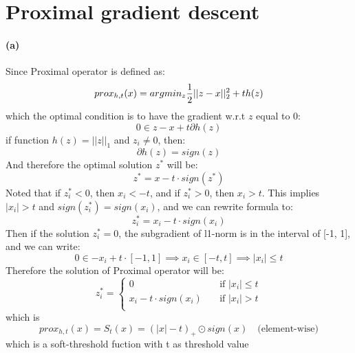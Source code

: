 \documentclass{article}
\begin{document}
\section{Proximal gradient descent}
\paragraph{(a)} Since Proximal operator is defined as:
\begin{equation}
prox_{h,t}(x) = argmin_z{1\over2}||z-x||_2^2 + th(z)
\end{equation}
which the optimal condition is to have the gradient w.r.t $z$ equal to 0:
\begin{equation}
0 \in z-x+t\partial h(z)
\end{equation}
if function $h(z)=||z||_1$ and $z_i \neq 0$, then:
\begin{equation}
\partial h(z) = sign(z)
\end{equation}
And therefore the optimal solution $z^\ast$ will be:
\begin{equation}
z^\ast = x - t\cdot sign(z^\ast)
\end{equation}
Noted that if $z_i^\ast<0$, then $x_i<-t$, and if $z_i^\ast>0$, then $x_i>t$. This implies $|x_i|>t$ and $sign(z_i^\ast) = sign(x_i)$, and we can rewrite formula to:
\begin{equation}
z_i^\ast = x_i - t\cdot sign(x_i)
\end{equation}
Then if the solution $z_i^\ast=0$, the subgradient of l1-norm is in the interval of [-1, 1], and we can write:
\begin{equation}
0 \in -x_i + t \cdot [-1,1] \implies x_i \in [-t, t] \implies |x_i| \leq t
\end{equation}
Therefore the solution of Proximal operator will be:
\begin{equation}
z_i^\ast = \begin{cases}
    0       & \quad \text{if } |x_i|\leq t\\
    x_i - t \cdot sign(x_i)  & \quad \text{if } |x_i|>t\\
  \end{cases}
\end{equation}
which is
\begin{equation}
prox_{h,t}(x) = S_t(x) = (|x|-t)_+\odot sign(x) \quad \text{(element-wise)}
\end{equation}
which is a soft-threshold fuction with t as threshold value\\
\end{document}
